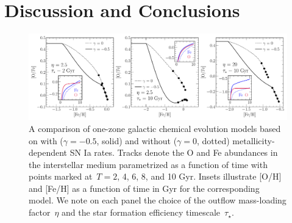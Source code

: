 \documentclass[foo.tex]{subfiles}
\begin{document}
\section{Discussion and Conclusions}
\label{sec:conclusions}

\begin{figure}
\centering
\includegraphics[scale = 0.46]{onezone_application.pdf}
\caption{
A comparison of one-zone galactic chemical evolution models based on
\citet[][for details, see their~\S~2]{Johnson2020} with ($\gamma = -0.5$,
solid) and without ($\gamma = 0$, dotted) metallicity-dependent SN Ia rates.
Tracks denote the O and Fe abundances in the interstellar medium parametrized
as a function of time with points marked at~$T = 2$, 4, 6, 8, and 10 Gyr.
Insets illustrate [O/H] and [Fe/H] as a function of time in Gyr for the
corresponding model.
We note on each panel the choice of the outflow mass-loading factor~$\eta$ and
the star formation efficiency timescale~$\tau_\star$.
}
\label{fig:onezone_app}
\end{figure}
\end{document}
